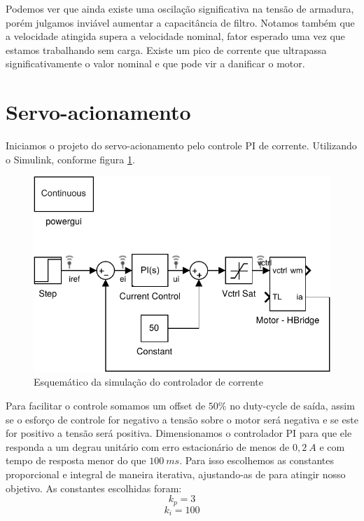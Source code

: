 \documentclass{article}
\begin{document}
Podemos ver que ainda existe uma oscilação significativa na tensão de armadura, porém julgamos inviável aumentar a capacitância de filtro. Notamos também que a velocidade atingida supera a velocidade nominal, fator esperado uma vez que estamos trabalhando sem carga. Existe um pico de corrente que ultrapassa significativamente o valor nominal e que pode vir a danificar o motor.

\section{Servo-acionamento}
Iniciamos o projeto do servo-acionamento pelo controle PI de corrente. Utilizando o Simulink, conforme figura \ref{fig:sim2}.

\begin{figure}[H]
	\centering
	\includegraphics[width=\linewidth]{matlab/sim2}
	\caption{Esquemático da simulação do controlador de corrente}
	\label{fig:sim2}
\end{figure}

Para facilitar o controle somamos um offset de $50\%$ no duty-cycle de saída, assim se o esforço de controle for negativo a tensão sobre o motor será negativa e se este for positivo a tensão será positiva. Dimensionamos o controlador PI para que ele responda a um degrau unitário com erro estacionário de menos de $0,2\ A$ e com tempo de resposta menor do que $100\ ms$. Para isso escolhemos as constantes proporcional e integral de maneira iterativa, ajustando-as de para atingir nosso objetivo. As constantes escolhidas foram:
\begin{equation}
	k_p = 3
\end{equation}
\begin{equation}
	k_i = 100
\end{equation}
\end{document}
